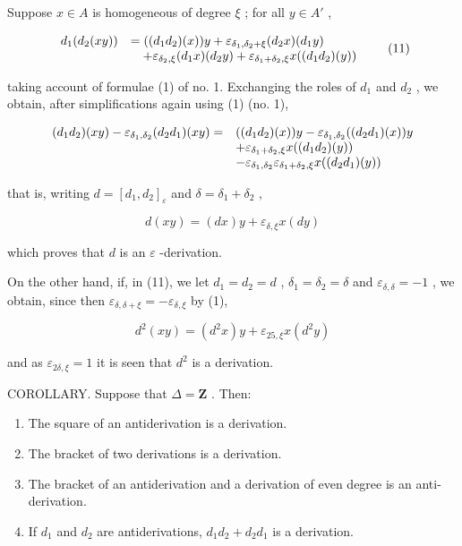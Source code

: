 Suppose \(x \in A\) is homogeneous of degree \(\xi\) ; for all \(y \in A'\) ,

\[
\begin{array}{r l} d _ {1} (d _ {2} (x y)) & = ((d _ {1} d _ {2}) (x)) y + \varepsilon_ {\delta_ {1}, \delta_ {2} + \xi} (d _ {2} x) (d _ {1} y) \\ & \quad + \varepsilon_ {\delta_ {2}, \xi} (d _ {1} x) (d _ {2} y) + \varepsilon_ {\delta_ {1} + \delta_ {2}, \xi} x ((d _ {1} d _ {2}) (y)) \end{array}\tag{11}
\]

taking account of formulae (1) of no. 1. Exchanging the roles of \(d_1\) and \(d_2\) , we obtain, after simplifications again using (1) (no. 1),

\[
\begin{array}{r l} (d _ {1} d _ {2}) (x y) - \varepsilon_ {\delta_ {1}, \delta_ {2}} (d _ {2} d _ {1}) (x y) = & ((d _ {1} d _ {2}) (x)) y - \varepsilon_ {\delta_ {1}, \delta_ {2}} ((d _ {2} d _ {1}) (x)) y \\ & + \varepsilon_ {\delta_ {1} + \delta_ {2}, \xi} x ((d _ {1} d _ {2}) (y)) \\ & - \varepsilon_ {\delta_ {1}, \delta_ {2}} \varepsilon_ {\delta_ {1} + \delta_ {2}, \xi} x ((d _ {2} d _ {1}) (y)) \end{array}
\]

that is, writing \(d = [d_1, d_2]_{\varepsilon}\) and \(\delta = \delta_1 + \delta_2\) ,

\[
d (x y) = (d x) y + \varepsilon_ {\delta , \xi} x (d y)
\]

which proves that \(d\) is an \(\varepsilon\) -derivation.

On the other hand, if, in (11), we let \(d_1 = d_2 = d\) , \(\delta_1 = \delta_2 = \delta\) and \(\varepsilon_{\delta,\delta} = -1\) , we obtain, since then \(\varepsilon_{\delta,\delta + \xi} = -\varepsilon_{\delta,\xi}\) by (1),

\[
d ^ {2} (x y) = \left(d ^ {2} x\right) y + \varepsilon_ {2 5, \xi} x \left(d ^ {2} y\right)
\]

and as \(\varepsilon_{2\delta, \xi} = 1\) it is seen that \(d^2\) is a derivation.

COROLLARY. Suppose that \(\Delta = \mathbf{Z}\) . Then:

\begin{enumerate}
\def\labelenumi{(\roman{enumi})}
\item
  The square of an antiderivation is a derivation.
\item
  The bracket of two derivations is a derivation.
\item
  The bracket of an antiderivation and a derivation of even degree is an anti-derivation.
\item
  If \(d_1\) and \(d_2\) are antiderivations, \(d_1d_2 + d_2d_1\) is a derivation.
\end{enumerate}

